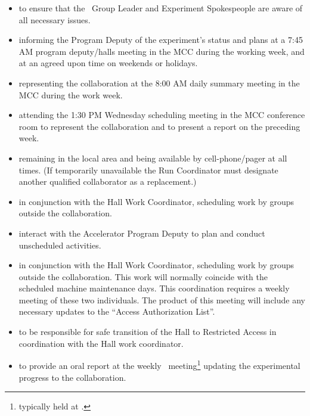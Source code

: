 \documentclass[10pt]{article}
\begin{document}
\begin{itemize}

\item to ensure that the \HALL\ Group Leader and Experiment
Spokespeople are  aware of all necessary issues.


\item informing the Program Deputy of the experiment's status and plans at
a 7:45 AM program deputy/halls meeting in the MCC during the working week, and at an agreed
upon time on weekends or holidays.

\item representing the collaboration at the 8:00 AM daily summary meeting in the MCC
during the work week.

\item attending the 1:30 PM Wednesday scheduling meeting in the MCC conference
room to represent the collaboration and to present a report on the
preceding week.

\item remaining in the local area and being available by cell-phone/pager
at all times.  (If temporarily unavailable the Run Coordinator must designate another
qualified collaborator as a replacement.)

\item in conjunction with the Hall Work Coordinator, scheduling work by groups
outside the collaboration.

\item interact with the Accelerator Program Deputy to plan and conduct
unscheduled activities.


\item in conjunction with the Hall Work Coordinator, scheduling
work by groups outside the collaboration. This work will
normally coincide with the scheduled  machine maintenance days.
This coordination requires a weekly meeting of these  two
individuals. The product of this meeting will include any necessary
updates to the ``Access  Authorization List''.

\item to be responsible for safe transition of the Hall to
Restricted Access in coordination with the Hall work
coordinator.

\item to provide an oral report at the weekly \HALL\
meeting\footnote{typically held at {\HALLMEETINGTIME}.} updating the
experimental progress to the collaboration.


\end{itemize}
\end{document}
